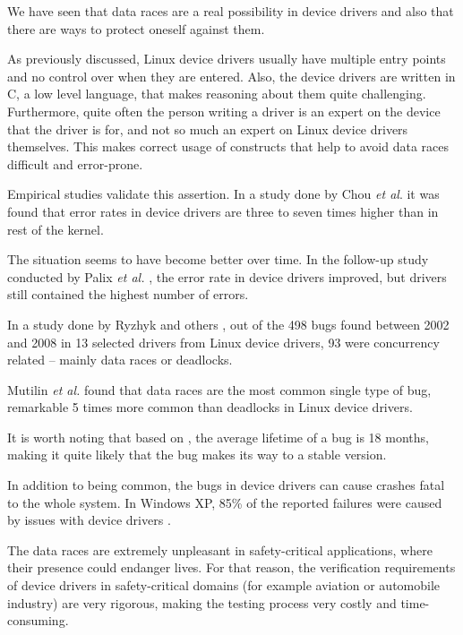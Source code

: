 \documentclass[..thesis.tex]{subfiles}
\begin{document}
We have seen that data races are a real possibility in device drivers and also that there are ways to protect oneself against them. 


As previously discussed, Linux device drivers usually have multiple entry points and no control over when they are entered. Also, the device drivers are written in C,
a low level language, that makes reasoning about them quite challenging. Furthermore, quite often the person writing a driver is an expert on the device that the driver is for,
and not so much an expert on Linux device drivers themselves. This makes correct usage of constructs that help to avoid data races difficult and error-prone.



Empirical studies validate this assertion. In a study done by Chou \textit{et al}. \cite{chou_empirical_2001} it was found that error rates in device drivers are three to seven times higher than in rest of the kernel. 

The situation seems to have become better over time. In the follow-up study conducted by Palix \textit{et al.} \cite{palix_faults_2011}, the error rate in device drivers improved, but drivers still contained the highest number of errors.

In a study done by Ryzhyk and others \cite{ryzhyk_dingo_2009}, out of the 498 bugs found between 2002 and 2008 in 13 selected drivers from Linux device drivers, 93 were concurrency related -- mainly data races or deadlocks. 

Mutilin \textit{et al.} \cite{mutilin_analysis_2012} found that data races are the most common single type of bug, remarkable 5 times more common than deadlocks in Linux device drivers.

It is worth noting that based on \cite{chou_empirical_2001,palix_faults_2011}, the average lifetime of a bug is 18 months, making it quite likely that the bug makes its way to a stable version. 


In addition to being common, the bugs in device drivers can cause crashes fatal to the whole system. In Windows XP, 85\% of the reported failures were caused by issues with device drivers \cite{swift_improving_2003}.

The data races are extremely unpleasant in safety-critical applications, where their presence could endanger lives. For that reason, the verification requirements of device drivers in safety-critical domains (for example aviation or automobile industry) are very rigorous, making the testing process very costly and time-consuming.
\end{document}
